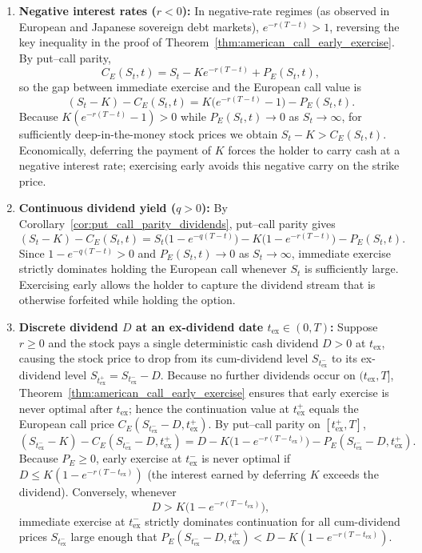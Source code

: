 \begin{enumerate}
    \item \textbf{Negative interest rates ($r < 0$):} In negative-rate regimes (as observed in European and Japanese sovereign debt markets), $e^{-r(T - t)} > 1$, reversing the key inequality in the proof of Theorem~\ref{thm:american_call_early_exercise}. By put--call parity,
    \[
        C_E(S_t, t) = S_t - K e^{-r(T - t)} + P_E(S_t, t),
    \]
    so the gap between immediate exercise and the European call value is
    \[
        (S_t - K) - C_E(S_t, t) = K\bigl(e^{-r(T - t)} - 1\bigr) - P_E(S_t, t).
    \]
    Because $K(e^{-r(T - t)} - 1) > 0$ while $P_E(S_t, t) \to 0$ as $S_t \to \infty$, for sufficiently deep-in-the-money stock prices we obtain $S_t - K > C_E(S_t, t)$. Economically, deferring the payment of $K$ forces the holder to carry cash at a negative interest rate; exercising early avoids this negative carry on the strike price.

    \item \textbf{Continuous dividend yield ($q > 0$):} By Corollary~\ref{cor:put_call_parity_dividends}, put--call parity gives
    \[
        (S_t - K) - C_E(S_t, t) = S_t\bigl(1 - e^{-q(T - t)}\bigr) - K\bigl(1 - e^{-r(T - t)}\bigr) - P_E(S_t, t).
    \]
    Since $1 - e^{-q(T - t)} > 0$ and $P_E(S_t, t) \to 0$ as $S_t \to \infty$, immediate exercise strictly dominates holding the European call whenever $S_t$ is sufficiently large. Exercising early allows the holder to capture the dividend stream that is otherwise forfeited while holding the option.

    \item \textbf{Discrete dividend $D$ at an ex-dividend date $t_{\mathrm{ex}} \in (0, T)$:} Suppose $r \ge 0$ and the stock pays a single deterministic cash dividend $D > 0$ at $t_{\mathrm{ex}}$, causing the stock price to drop from its cum-dividend level $S_{t_{\mathrm{ex}}^-}$ to its ex-dividend level $S_{t_{\mathrm{ex}}^+} = S_{t_{\mathrm{ex}}^-} - D$. Because no further dividends occur on $(t_{\mathrm{ex}}, T]$, Theorem~\ref{thm:american_call_early_exercise} ensures that early exercise is never optimal after $t_{\mathrm{ex}}$; hence the continuation value at $t_{\mathrm{ex}}^+$ equals the European call price $C_E(S_{t_{\mathrm{ex}}^-} - D, t_{\mathrm{ex}}^+)$. By put--call parity on $[t_{\mathrm{ex}}^+, T]$,
    \[
        (S_{t_{\mathrm{ex}}^-} - K) - C_E(S_{t_{\mathrm{ex}}^-} - D, t_{\mathrm{ex}}^+) = D - K\bigl(1 - e^{-r(T - t_{\mathrm{ex}})}\bigr) - P_E(S_{t_{\mathrm{ex}}^-} - D, t_{\mathrm{ex}}^+).
    \]
    Because $P_E \ge 0$, early exercise at $t_{\mathrm{ex}}^-$ is never optimal if $D \le K(1 - e^{-r(T - t_{\mathrm{ex}})})$ (the interest earned by deferring $K$ exceeds the dividend). Conversely, whenever
    \begin{equation}
    \label{eq:discrete_div_threshold}
        D > K\bigl(1 - e^{-r(T - t_{\mathrm{ex}})}\bigr),
    \end{equation}
    immediate exercise at $t_{\mathrm{ex}}^-$ strictly dominates continuation for all cum-dividend prices $S_{t_{\mathrm{ex}}^-}$ large enough that $P_E(S_{t_{\mathrm{ex}}^-} - D, t_{\mathrm{ex}}^+) < D - K(1 - e^{-r(T - t_{\mathrm{ex}})})$.
\end{enumerate}

